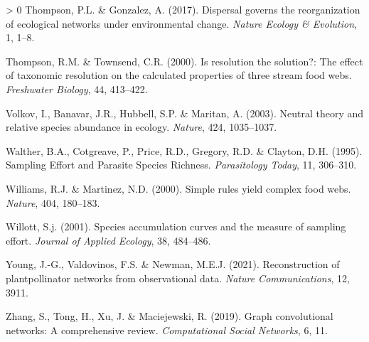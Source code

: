 \documentclass[11pt]{article}
\newlength{\cslhangindent}
\newenvironment{CSLReferences}[3] %
 {%
  \setlength{\parindent}{0pt}
  \ifodd #1 \everypar{\setlength{\hangindent}{\cslhangindent}}\ignorespaces\fi
  \ifnum #2 > 0
  \setlength{\parskip}{#2\baselineskip}
  \fi
 }%
 {}
\begin{document}
\begin{CSLReferences}{1}{0}
\leavevmode\hypertarget{ref-Thompson2017DisGov}{}%
Thompson, P.L. \& Gonzalez, A. (2017). Dispersal governs the
reorganization of ecological networks under environmental change.
\emph{Nature Ecology \& Evolution}, 1, 1--8.

\leavevmode\hypertarget{ref-Thompson2000ResSol}{}%
Thompson, R.M. \& Townsend, C.R. (2000). Is resolution the solution?:
The effect of taxonomic resolution on the calculated properties of three
stream food webs. \emph{Freshwater Biology}, 44, 413--422.

\leavevmode\hypertarget{ref-Volkov2003NeuThe}{}%
Volkov, I., Banavar, J.R., Hubbell, S.P. \& Maritan, A. (2003). Neutral
theory and relative species abundance in ecology. \emph{Nature}, 424,
1035--1037.

\leavevmode\hypertarget{ref-Walther1995SamEff}{}%
Walther, B.A., Cotgreave, P., Price, R.D., Gregory, R.D. \& Clayton,
D.H. (1995). Sampling Effort and Parasite Species Richness.
\emph{Parasitology Today}, 11, 306--310.

\leavevmode\hypertarget{ref-Williams2000SimRul}{}%
Williams, R.J. \& Martinez, N.D. (2000). Simple rules yield complex food
webs. \emph{Nature}, 404, 180--183.

\leavevmode\hypertarget{ref-Willott2001SpeAcc}{}%
Willott, S.j. (2001). Species accumulation curves and the measure of
sampling effort. \emph{Journal of Applied Ecology}, 38, 484--486.

\leavevmode\hypertarget{ref-Young2021RecPla}{}%
Young, J.-G., Valdovinos, F.S. \& Newman, M.E.J. (2021). Reconstruction
of plantpollinator networks from observational data. \emph{Nature
Communications}, 12, 3911.

\leavevmode\hypertarget{ref-Zhang2019GraCon}{}%
Zhang, S., Tong, H., Xu, J. \& Maciejewski, R. (2019). Graph
convolutional networks: A comprehensive review. \emph{Computational
Social Networks}, 6, 11.

\end{CSLReferences}
\end{document}
